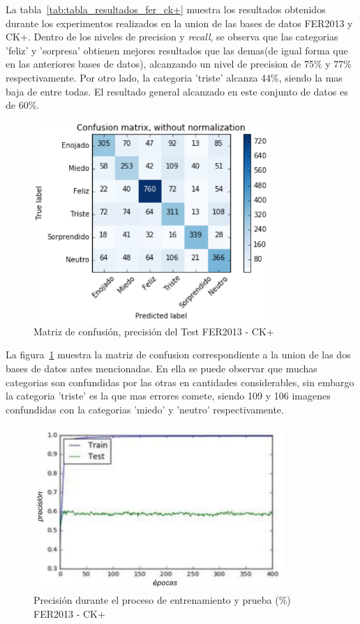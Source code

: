 La tabla~\ref{tab:tabla_resultados_fer_ck+} muestra los resultados obtenidos durante los experimentos realizados en la union de las bases de datos FER2013 y CK+. Dentro de los niveles de precision y \textit{recall}, se observa que las categorias 'feliz' y 'sorpresa' obtienen mejores resultados que las demas(de igual forma que en las anteriores bases de datos), alcanzando un nivel de precision de 75\% y 77\% respectivamente. Por otro lado, la categoria 'triste' alcanza 44\%, siendo la mas baja de entre todas. El resultado general alcanzado en este conjunto de datos es de 60\%.

\begin{figure}[H]
		\centering
		\includegraphics[width=90mm]{Imagenes/matriz_confusion_fer_ck+.png}
		\caption{Matriz de confusión, precisión del Test FER2013 - CK+}
		\label{fig:matriz_confusion_fer_ck+}
\end{figure}

La figura~\ref{fig:matriz_confusion_fer_ck+} muestra la matriz de confusion correspondiente a la union de las dos bases de datos antes mencionadas. En ella se puede observar que muchas categorias son confundidas por las otras en cantidades considerables, sin embargo la categoria 'triste' es la que mas errores comete, siendo 109 y 106 imagenes confundidas con la categorias 'miedo' y 'neutro' respectivamente. 
  
\begin{figure}[H]
		\centering
		\includegraphics[width=95mm]{Imagenes/precision_fer_ck+.pdf}
		\caption{Precisión durante el proceso de entrenamiento y prueba (\%) FER2013 - CK+}
		\label{fig:precision_fer_ck+}
\end{figure}

